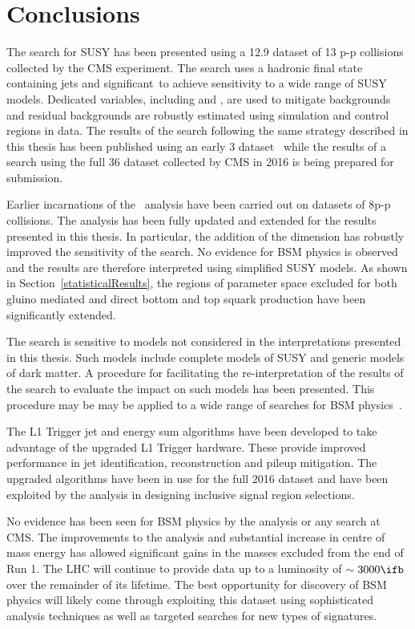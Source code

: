 \chapter{Conclusions}

The \alphat search for SUSY has been presented using a 12.9\ifb 
dataset of 13 \TeV p-p collisions collected by the CMS experiment. 
The search uses a hadronic final state containing jets and 
significant~\met to achieve sensitivity to a wide range of SUSY
models. Dedicated variables, including \alphat and \bdphi, are used 
to mitigate backgrounds and residual backgrounds 
are robustly estimated using simulation and control regions in data.
The results of the \alphat search following the same strategy
described in this thesis has been published using an early 
3 \ifb dataset~\cite{} while the results 
of a search using the full 36 \ifb dataset collected by CMS in 2016 
is being prepared for submission.

Earlier incarnations of the \alphat~analysis have been carried out
on datasets of 8\TeV p-p collisions. The analysis has been
fully updated and extended for the results presented in this thesis. 
In particular, the addition of the \mht dimension has robustly improved the sensitivity of the search. 
No evidence for BSM physics is observed and the results are 
therefore interpreted using simplified SUSY models. As shown in Section~\ref{statisticalResults}, 
the regions of parameter space excluded for both gluino mediated 
and direct bottom and top squark production have been 
significantly extended.

The \alphat search is sensitive to models not considered in the
interpretations presented in this thesis. Such models include 
complete models of SUSY and generic models of dark matter. 
A procedure for facilitating the re-interpretation of the results of the search to evaluate the 
impact on such models has been presented. This procedure may be
may be applied to a wide range of searches for BSM physics~\cite{simp-lik}.

The L1 Trigger jet and energy sum algorithms have been
developed to take advantage of the upgraded L1 Trigger hardware.
These provide improved performance in jet identification, 
reconstruction and pileup mitigation. The upgraded algorithms have
been in use for the full 2016 dataset and have been exploited
by the \alphat analysis in designing inclusive signal region selections.

No evidence has been seen for BSM physics by the \alphat analysis 
or any search at CMS. The improvements to the analysis and substantial
increase in centre of mass energy has allowed significant gains in
the masses excluded from the end of Run 1. The LHC will continue 
to provide data up to a luminosity of $\sim 3000 \ifb$ over the 
remainder of its lifetime. The best opportunity for discovery of 
BSM physics will likely come through exploiting this dataset 
using sophisticated analysis techniques as well as targeted searches 
for new types of signatures.
